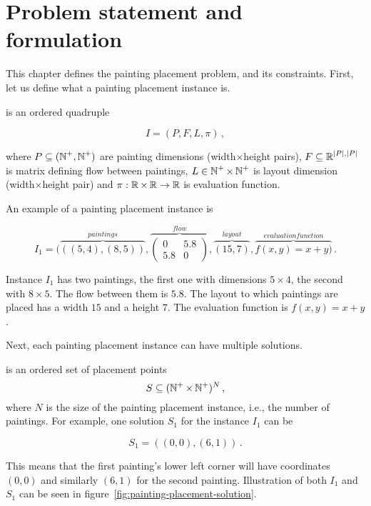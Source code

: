 \chapter{Problem statement and formulation}\label{ch:problem-statement-and-formulation}

This chapter defines the painting placement problem, and its constraints.
First, let us define what a painting placement instance is.

 is an ordered quadruple

\begin{equation}
    I = (P, F, L, \pi)\,,
    \label{eq:painting-placement-instance}
\end{equation}

where $P \subseteq (\operatorname*{\mathbb{N}}^+, \operatorname*{\mathbb{N}}^+)$ are painting dimensions (width$\times$height pairs),
$F \subseteq \operatorname*{\mathbb{R}}^{|P|, |P|}$ is matrix defining flow between paintings,
$L \in \operatorname*{\mathbb{N}}^+ \times \operatorname*{\mathbb{N}}^+$ is layout dimension (width$\times$height pair)
and $\pi: \operatorname*{\mathbb{R}} \times \operatorname*{\mathbb{R}} \to \operatorname*{\mathbb{R}}$ is evaluation function.

An example of a painting placement instance is

\[
    I_1 = (\overbrace{((5,4),(8,5))}^{paintings},
    \overbrace{\begin{pmatrix}
                   0   & 5.8 \\
                   5.8 & 0
    \end{pmatrix}}^{flow},
    \overbrace{(15,7)}^{layout},
    \overbrace{f(x,y) = x+y)}^{evaluation function}\,.
\]

Instance $I_1$ has two paintings, the first one with dimensions $5\times4$, the second with $8\times5$.
The flow between them is $5.8$. The layout to which paintings are placed has a width $15$ and a height $7$.
The evaluation function is $f(x,y) = x+y$.

Next, each painting placement instance can have multiple solutions.

 is an ordered set of placement points
\begin{equation}
    S \subseteq (\operatorname*{\mathbb{N}^+} \times \operatorname*{\mathbb{N}^+})^N  \,,
    \label{eq:painting-placement-solution}
\end{equation}
where $N$ is the size of the painting placement instance, i.e., the number of paintings.
For example, one solution $S_1$ for the instance $I_1$ can be

\[
    S_1 = ((0,0), (6,1)) \,.
\]

This means that the first painting's lower left corner will have coordinates $(0,0)$
and similarly $(6,1)$ for the second painting.
Illustration of both $I_1$ and $S_1$ can be seen in figure~\ref{fig:painting-placement-solution}.

